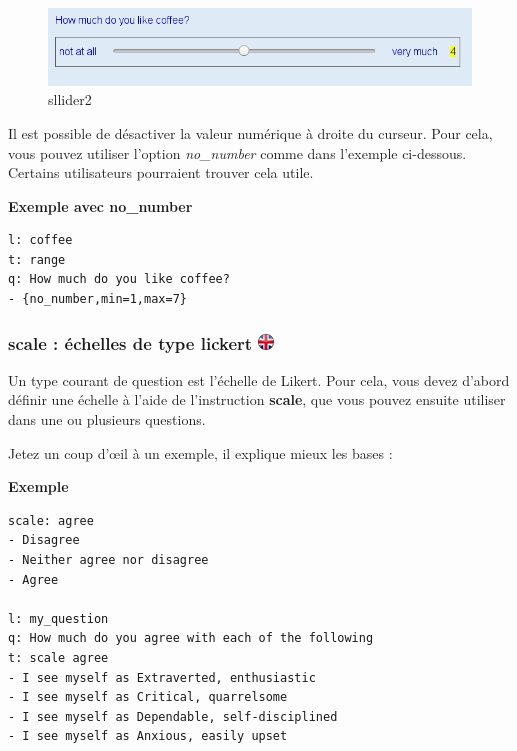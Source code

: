 \documentclass[
]{book}
\begin{document}
\begin{figure}
\centering
\includegraphics{img/slider2.png}
\caption{sllider2}
\end{figure}

Il est possible de désactiver la valeur numérique à droite du curseur.
Pour cela, vous pouvez utiliser l'option \emph{no\_number} comme dans
l'exemple ci-dessous. Certains utilisateurs pourraient trouver cela
utile.

\textbf{Exemple avec no\_number}

\begin{verbatim}
l: coffee
t: range
q: How much do you like coffee?
- {no_number,min=1,max=7}
\end{verbatim}

\hypertarget{scale-uxe9chelles-de-type-lickert}{%
\subsubsection[scale : échelles de type lickert ]{\texorpdfstring{scale
: échelles de type lickert
\href{https://www.psytoolkit.org/doc3.2.0/online-survey-syntax.html\#scales}{\protect\includegraphics{img/ukflag.png}}}{scale : échelles de type lickert }}\label{scale-uxe9chelles-de-type-lickert}}

Un type courant de question est l'échelle de Likert. Pour cela, vous
devez d'abord définir une échelle à l'aide de l'instruction
\textbf{scale}, que vous pouvez ensuite utiliser dans une ou plusieurs
questions.

Jetez un coup d'œil à un exemple, il explique mieux les bases :

\textbf{Exemple}

\begin{verbatim}
scale: agree
- Disagree
- Neither agree nor disagree
- Agree

l: my_question
q: How much do you agree with each of the following
t: scale agree
- I see myself as Extraverted, enthusiastic
- I see myself as Critical, quarrelsome
- I see myself as Dependable, self-disciplined
- I see myself as Anxious, easily upset
\end{verbatim}
\end{document}
